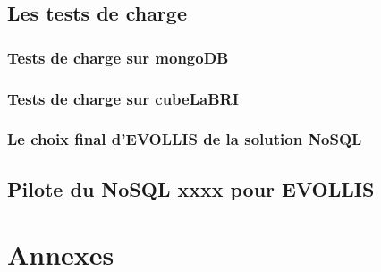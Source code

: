 \chapter{Les tests de charge}
\section{Tests de charge sur \textsf{mongoDB}}
\section{Tests de charge sur \textsf{cubeLaBRI}}
\section{Le choix final d'\textsf{EVOLLIS} de la solution \textsf{NoSQL}}

\chapter{Pilote du \textsf{NoSQL} xxxx pour \sf  EVOLLIS}



\printindex

\nocite{cassandra2}
\nocite{cassandra}
\nocite{NoSQLCmp}
\nocite{NoSQLeurope}
\nocite{NoSQLvsSQL}



\part{Annexes}
\appendix



